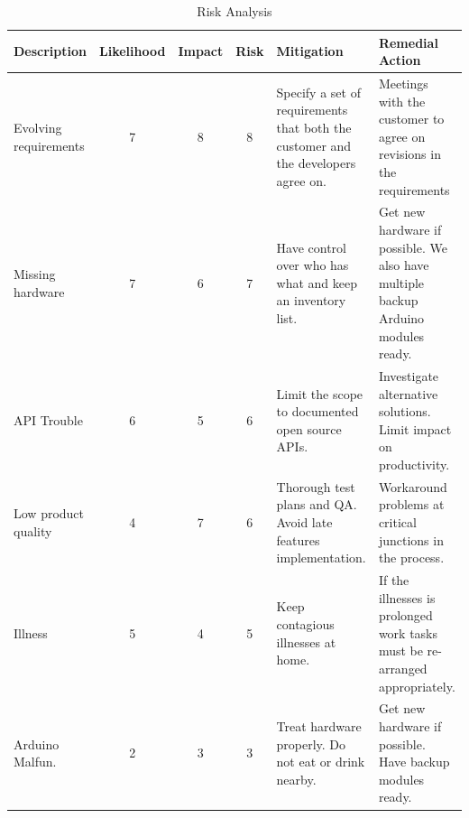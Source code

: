 \begin{table}
	\begin{center}
		\caption{Risk Analysis}
		\begin{tabular}{| p{2.1cm} | c | c | c | p{2.8cm} | p{3cm} |}
		\hline

\textbf{Description} & \textbf{Likelihood} & \textbf{Impact} & \textbf{Risk} & \textbf{Mitigation} & \textbf{Remedial Action}\\ \hline

Evolving requirements	& 7 & 8 & 8
			& Specify a set of requirements that both the customer and the developers agree on.
			& Meetings with the customer to agree on revisions in the requirements \\ \hline

Missing hardware	& 7 & 6 & 7
			& Have control over who has what and keep an inventory list.
			& Get new hardware if possible. We also have multiple backup Arduino modules ready. \\ \hline

API Trouble		& 6 & 5 & 6
			& Limit the scope to documented open source APIs.
			& Investigate alternative solutions. Limit impact on productivity. \\ \hline

Low product quality	& 4 & 7 & 6
			& Thorough test plans and QA. Avoid late features implementation.
			&  Workaround problems at critical junctions in the process.\\ \hline
			
Illness 		& 5 & 4 & 5
			& Keep contagious illnesses at home.
			& If the illnesses is prolonged work tasks must be re-arranged appropriately. \\ \hline

Arduino Malfun.		& 2 & 3 & 3
			& Treat hardware properly. Do not eat or drink nearby.
			& Get new hardware if possible. Have backup modules ready. \\ \hline


			

		\end{tabular}
	\end{center}	
	\label{table:riskanalysis}
\end{table}


